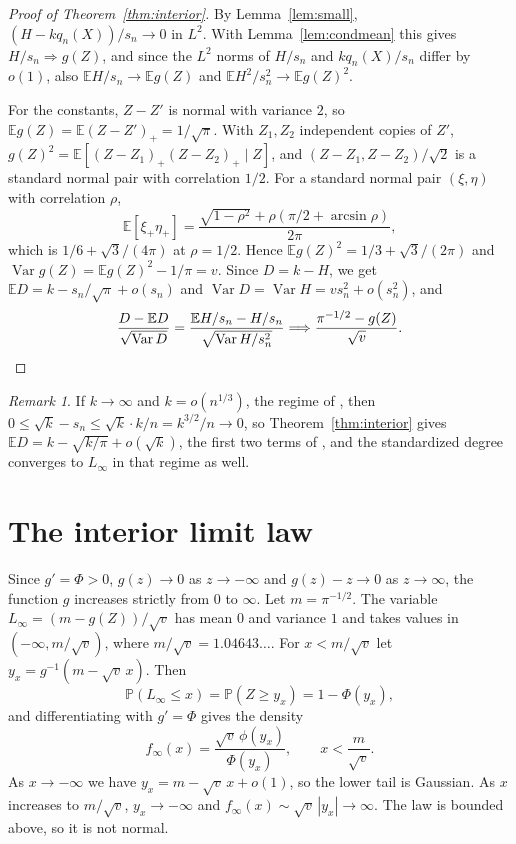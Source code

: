 \documentclass[11pt]{amsart}
\theoremstyle{remark}
\newtheorem{remark}[theorem]{Remark}
\numberwithin{equation}{section}
\newcommand{\E}{\mathbb E}
\newcommand{\Pp}{\mathbb P}
\newcommand{\1}{\mathbf 1}
\newcommand{\Var}{\operatorname{Var}}
\begin{document}
\begin{proof}[Proof of Theorem~\ref{thm:interior}]
By Lemma~\ref{lem:small}, $(H-kq_n(X))/s_n\to0$ in $L^2$. With Lemma~\ref{lem:condmean} this gives $H/s_n\Rightarrow g(Z)$, and since the $L^2$ norms of $H/s_n$ and $kq_n(X)/s_n$ differ by $o(1)$, also $\E H/s_n\to\E g(Z)$ and $\E H^2/s_n^2\to\E g(Z)^2$.

For the constants, $Z-Z'$ is normal with variance $2$, so $\E g(Z)=\E(Z-Z')_+=1/\sqrt\pi$. With $Z_1,Z_2$ independent copies of $Z'$, $g(Z)^2=\E[(Z-Z_1)_+(Z-Z_2)_+\mid Z]$, and $(Z-Z_1,Z-Z_2)/\sqrt2$ is a standard normal pair with correlation $1/2$. For a standard normal pair $(\xi,\eta)$ with correlation $\rho$,
\[
\E[\xi_+\eta_+]=\frac{\sqrt{1-\rho^2}+\rho(\pi/2+\arcsin\rho)}{2\pi},
\]
which is $1/6+\sqrt3/(4\pi)$ at $\rho=1/2$. Hence $\E g(Z)^2=1/3+\sqrt3/(2\pi)$ and $\Var g(Z)=\E g(Z)^2-1/\pi=v$. Since $D=k-H$, we get $\E D=k-s_n/\sqrt\pi+o(s_n)$ and $\Var D=\Var H=vs_n^2+o(s_n^2)$, and
\[
\frac{D-\E D}{\sqrt{\Var D}}=\frac{\E H/s_n-H/s_n}{\sqrt{\Var H/s_n^2}}\Longrightarrow\frac{\pi^{-1/2}-g(Z)}{\sqrt v}.\qedhere
\]
\end{proof}

\begin{remark}\label{rem:DS}
If $k\to\infty$ and $k=o(n^{1/3})$, the regime of \cite[Theorem~8]{DS}, then $0\le\sqrt k-s_n\le\sqrt k\cdot k/n=k^{3/2}/n\to0$, so Theorem~\ref{thm:interior} gives $\E D=k-\sqrt{k/\pi}+o(\sqrt k)$, the first two terms of \cite[Theorem~8]{DS}, and the standardized degree converges to $L_\infty$ in that regime as well.
\end{remark}

\section{The interior limit law}\label{sec:law}

Since $g'=\Phi>0$, $g(z)\to0$ as $z\to-\infty$ and $g(z)-z\to0$ as $z\to\infty$, the function $g$ increases strictly from $0$ to $\infty$. Let $m=\pi^{-1/2}$. The variable $L_\infty=(m-g(Z))/\sqrt v$ has mean $0$ and variance $1$ and takes values in $(-\infty,m/\sqrt v)$, where $m/\sqrt v=1.04643\ldots$. For $x<m/\sqrt v$ let $y_x=g^{-1}(m-\sqrt v\,x)$. Then
\begin{equation}\label{eq:Lcdf}
\Pp(L_\infty\le x)=\Pp(Z\ge y_x)=1-\Phi(y_x),
\end{equation}
and differentiating with $g'=\Phi$ gives the density
\begin{equation}\label{eq:Ldens}
f_\infty(x)=\frac{\sqrt v\,\phi(y_x)}{\Phi(y_x)},\qquad x<\frac m{\sqrt v}.
\end{equation}
As $x\to-\infty$ we have $y_x=m-\sqrt v\,x+o(1)$, so the lower tail is Gaussian. As $x$ increases to $m/\sqrt v$, $y_x\to-\infty$ and $f_\infty(x)\sim\sqrt v\,|y_x|\to\infty$. The law is bounded above, so it is not normal.
\end{document}

